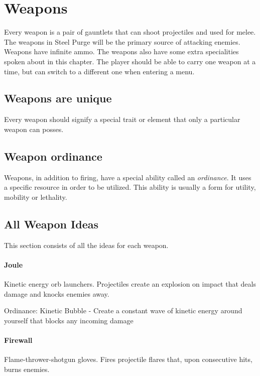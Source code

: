 \documentclass[../Main.tex]{subfiles}
\begin{document}
\section{Weapons}

Every weapon is a pair of gauntlets that can shoot projectiles and used for melee. The weapons in Steel Purge will be the primary source of attacking enemies. Weapons have infinite ammo. The weapons also have some extra specialities spoken about in this chapter. The player should be able to carry one weapon at a time, but can switch to a different one when entering a menu.

\subsection{Weapons are unique}

Every weapon should signify a special trait or element that only a particular weapon can posses.

\subsection{Weapon ordinance}

Weapons, in addition to firing, have a special ability called an \emph{ordinance}. It uses a specific resource in order to be utilized. This ability is usually a form for utility, mobility or lethality.

\subsection{All Weapon Ideas}

This section consists of all the ideas for each weapon.

\paragraph{Joule}

Kinetic energy orb launchers. Projectiles create an explosion on impact that deals damage and knocks enemies away. 

Ordinance: Kinetic Bubble - Create a constant wave of kinetic energy around yourself that blocks any incoming damage

\paragraph{Firewall}

Flame-thrower-shotgun gloves. Fires projectile flares that, upon consecutive hits, burns enemies.
\end{document}
